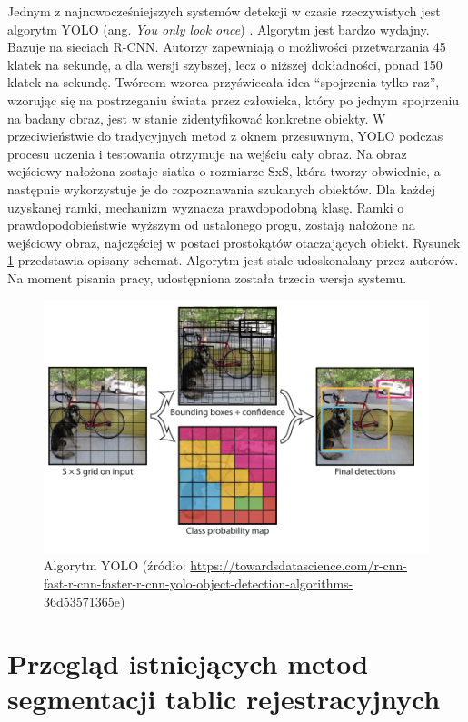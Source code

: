 Jednym z najnowocześniejszych systemów detekcji w czasie rzeczywistych jest algorytm YOLO (ang. \textit{You only look once}) \cite{7780460}.
Algorytm jest bardzo wydajny.
Bazuje na sieciach R-CNN.
Autorzy zapewniają o możliwości przetwarzania 45 klatek na sekundę, a dla wersji szybszej, lecz o niższej dokładności, ponad 150 klatek na sekundę.
Twórcom wzorca przyświecała idea ``spojrzenia tylko raz'', wzorując się na postrzeganiu świata przez człowieka, który po jednym spojrzeniu na badany obraz, jest w stanie zidentyfikować konkretne obiekty.
W przeciwieństwie do tradycyjnych metod z oknem przesuwnym, YOLO podczas procesu uczenia i testowania otrzymuje na wejściu cały obraz.
Na obraz wejściowy nałożona zostaje siatka o rozmiarze SxS, która tworzy obwiednie, a następnie wykorzystuje je do rozpoznawania szukanych obiektów.
Dla każdej uzyskanej ramki, mechanizm wyznacza prawdopodobną klasę.
Ramki o prawdopodobieństwie wyższym od ustalonego progu, zostają nałożone na wejściowy obraz, najczęściej w postaci prostokątów otaczających obiekt.
Rysunek \ref{fig:yolo} przedstawia opisany schemat.
Algorytm jest stale udoskonalany przez autorów.
Na moment pisania pracy, udostępniona została trzecia wersja systemu.

\begin{figure}[!ht]
    \centering
    \includegraphics[scale=0.4]{Pictures/yolo}
    \caption{Algorytm YOLO (źródło: \url{https://towardsdatascience.com/r-cnn-fast-r-cnn-faster-r-cnn-yolo-object-detection-algorithms-36d53571365e})}
    \label{fig:yolo}
\end{figure}
\FloatBarrier


\section{Przegląd istniejących metod segmentacji tablic rejestracyjnych}
